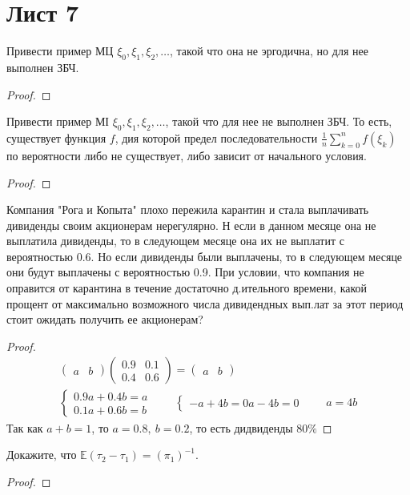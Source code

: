 \section{Лист 7}
    \begin{prob}
        Привести пример МЦ $\xi_{0}, \xi_{1}, \xi_{2}, \ldots$, такой что она не эргодична, но для нее выполнен ЗБЧ.
    \end{prob}
    \begin{proof}
    \end{proof}
\vskip 0.6in


 
    \begin{prob}
        Привести пример МІ $\xi_{0}, \xi_{1}, \xi_{2}, \ldots$, такой что для нее не выполнен ЗБЧ. То есть, существует функция $f$, дия которой предел последовательности $\frac{1}{n} \sum_{k=0}^{n} f\left(\xi_{k}\right)$ по вероятности либо не существует, либо зависит от начального условия.
    \end{prob}
    \begin{proof}
        
    \end{proof}
\vskip 0.6in


 
    \begin{prob}
        Компания "Рога и Копыта" плохо пережила карантин и стала выплачивать дивиденды своим акционерам нерегулярно. Н если в данном месяце она не выплатила дивиденды, то в следующем месяце она их не выплатит с вероятностью 0.6. Но если дивиденды были выплачены, то в следующем месяце они будут выплачены с вероятностью 0.9. При условии, что компания не оправится от карантина в течение достаточно д.ительного времени, какой прощент от максимально возможного числа дивидендных вып.лат за этот период стоит ожидать получить ее акционерам?
    \end{prob}
    \begin{proof}
        \begin{gather*}
        \begin{pmatrix}
            a & b
        \end{pmatrix}
        \begin{pmatrix}
            0.9 & 0.1\\
            0.4 & 0.6
        \end{pmatrix}
        =
        \begin{pmatrix}
            a & b
        \end{pmatrix}\\
        \begin{cases}
            0.9 a + 0.4 b = a\\
            0.1 a + 0.6 b = b
        \end{cases}
        \qquad
        \begin{cases}
            -a + 4b = 0
            a - 4b = 0
        \end{cases}
        \qquad
        a = 4b
        \end{gather*}
        Так как $a + b = 1$, то $a = 0.8,\ b = 0.2$, то есть дидвиденды $80\%$
    \end{proof}
\vskip 0.6in


 
    \begin{prob}
        Докажите, что $\mathbb{E} \left(\tau_{2} - \tau_{1}\right) = \left(\pi_{1}\right)^{-1}$.
    \end{prob}
    \begin{proof}
    \end{proof}
